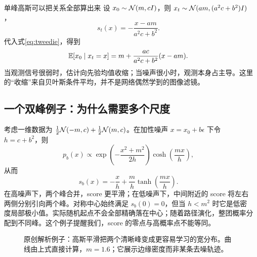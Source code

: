 \begin{examplebox}{单峰高斯可以把关系全部算出来}
设 $x_0\sim\mathcal{N}(m,cI)$，则 $x_t\sim\mathcal{N}(am,(a^2c+b^2)I)$，
\begin{equation}
 s_t(x)=-\frac{x-am}{a^2c+b^2}.
\end{equation}
代入式\eqref{eq:tweedie}，得到
\begin{equation}
 \mathbb{E}[x_0\mid x_t=x]
 =m+\frac{ac}{a^2c+b^2}(x-am).
\end{equation}
当观测信号很弱时，估计向先验均值收缩；当噪声很小时，观测本身占主导。这里的“收缩”来自贝叶斯条件平均，并不是网络偶然学到的图像滤镜。
\end{examplebox}

\subsection{一个双峰例子：为什么需要多个尺度}
考虑一维数据为 $\tfrac12\mathcal{N}(-m,c)+\tfrac12\mathcal{N}(m,c)$。在加性噪声 $x=x_0+b\epsilon$ 下令 $h=c+b^2$，则
\begin{equation}
 p_b(x)\propto\exp\left(-\frac{x^2+m^2}{2h}\right)
 \cosh\left(\frac{mx}{h}\right),
\end{equation}
从而
\begin{equation}
 s_b(x)=-\frac{x}{h}+\frac m h\tanh\left(\frac{mx}{h}\right).
\end{equation}
在高噪声下，两个峰合并，score 更平滑；在低噪声下，中间附近的 score 将左右两侧分别引向两个峰。对称中心始终满足 $s_b(0)=0$，但当 $h<m^2$ 时它是低密度局部极小值。实际随机起点不会全部精确落在中心；随着路径演化，整团概率分配到不同峰。这个例子提醒我们，score 的零点与高概率点不能等同。

\begin{figure}[htbp]\centering
{}
\caption{原创解析例子：高斯平滑把两个清晰峰变成更容易学习的宽分布。曲线由上式直接计算，$m=1.6$；它展示边缘密度而非某条去噪轨迹。}\label{fig:math-mixture}
\end{figure}

